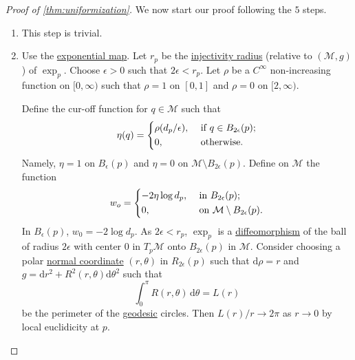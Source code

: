 \begin{proof}[Proof of \autoref{thm:uniformization}]
	We now start our proof following the \(5\) steps.

	\begin{enumerate}
		\item This step is trivial.
		\item Use the \hyperref[def:exponential-map]{exponential map}. Let \(r_p\) be the \hyperref[def:injectivity-radius]{injectivity radius} (relative to \((\mathcal{M} , g)\)) of \(\exp _p\). Choose \(\epsilon >0\) such that \(2 \epsilon < r_p\). Let \(\rho \) be a \(C^{\infty} \) non-increasing function on \([0, \infty )\) such that \(\rho = 1\) on \([0, 1]\) and \(\rho = 0\) on \([2, \infty )\).
		      \begin{center}
		      \end{center}
		      Define the cur-off function for \(q\in \mathcal{M} \) such that
		      \[
			      \eta (q) = \begin{dcases}
				      \rho (d_p / \epsilon ), & \text{ if } q \in B_{2\epsilon }(p) ; \\
				      0,                      & \text{ otherwise} .
			      \end{dcases}
		      \]
		      Namely, \(\eta = 1\) on \(B_{\epsilon } (p)\) and \(\eta = 0\) on \(\mathcal{M} \setminus B_{2\epsilon }(p)\). Define on \(\mathcal{M} \) the function
		      \[
			      w_o = \begin{dcases}
				      -2 \eta \log d_p, & \text{ in } B_{2\epsilon }(p)  ;                       \\
				      0,                & \text{ on } \mathcal{M} \setminus B_{2\epsilon }(p)  .
			      \end{dcases}
		      \]
		      In \(B_{\epsilon } (p)\), \(w_0 = - 2 \log d_p\). As \(2\epsilon < r_p\), \(\exp _p\) is a \hyperref[def:diffeomorphism]{diffeomorphism} of the ball of radius \(2\epsilon \) with center \(0\) in \(T_p \mathcal{M} \) onto \(B_{2\epsilon } (p)\) in \(\mathcal{M} \). Consider choosing a polar \hyperref[def:normal-coordinate]{normal coordinate} \((r, \theta )\) in \(R_{2 \epsilon }(p)\) such that \(\mathrm{d} \rho = r\) and \(g = \mathrm{d} r^2 + R^2(r, \theta )\mathrm{d} \theta ^2\) such that
		      \[
			      \int_{0}^{\pi } R(r, \theta ) \,\mathrm{d}\theta = L(r)
		      \]
		      be the perimeter of the \hyperref[def:geodesic]{geodesic} circles. Then \(L(r) / r \to 2\pi \) as \(r \to 0\) by local euclidicity at \(p\).


\end{enumerate}
\end{proof}
